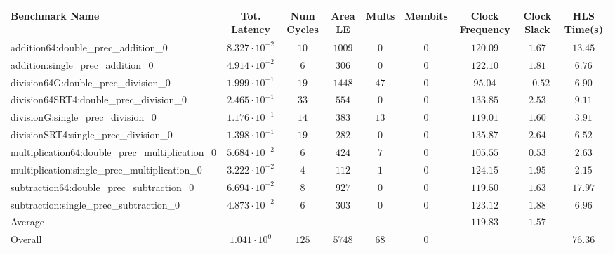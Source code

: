 \begin{tabular}{|l|c|c|c|c|c|c|c|c|}
\hline
Benchmark Name                                   & Tot. Latency            & Num Cycles & Area LE  & Mults  & Membits & Clock Frequency & Clock Slack & HLS Time(s) \\
\hline
addition64:double\_prec\_addition\_0             & $ 8.327 \cdot 10^{-2} $ & $ 10     $ & $ 1009 $ & $ 0  $ & $ 0   $ & $ 120.09      $ & $ 1.67    $ & $ 13.45   $ \\
addition:single\_prec\_addition\_0               & $ 4.914 \cdot 10^{-2} $ & $ 6      $ & $ 306  $ & $ 0  $ & $ 0   $ & $ 122.10      $ & $ 1.81    $ & $ 6.76    $ \\
division64G:double\_prec\_division\_0            & $ 1.999 \cdot 10^{-1} $ & $ 19     $ & $ 1448 $ & $ 47 $ & $ 0   $ & $ 95.04       $ & $ -0.52   $ & $ 6.90    $ \\
division64SRT4:double\_prec\_division\_0         & $ 2.465 \cdot 10^{-1} $ & $ 33     $ & $ 554  $ & $ 0  $ & $ 0   $ & $ 133.85      $ & $ 2.53    $ & $ 9.11    $ \\
divisionG:single\_prec\_division\_0              & $ 1.176 \cdot 10^{-1} $ & $ 14     $ & $ 383  $ & $ 13 $ & $ 0   $ & $ 119.01      $ & $ 1.60    $ & $ 3.91    $ \\
divisionSRT4:single\_prec\_division\_0           & $ 1.398 \cdot 10^{-1} $ & $ 19     $ & $ 282  $ & $ 0  $ & $ 0   $ & $ 135.87      $ & $ 2.64    $ & $ 6.52    $ \\
multiplication64:double\_prec\_multiplication\_0 & $ 5.684 \cdot 10^{-2} $ & $ 6      $ & $ 424  $ & $ 7  $ & $ 0   $ & $ 105.55      $ & $ 0.53    $ & $ 2.63    $ \\
multiplication:single\_prec\_multiplication\_0   & $ 3.222 \cdot 10^{-2} $ & $ 4      $ & $ 112  $ & $ 1  $ & $ 0   $ & $ 124.15      $ & $ 1.95    $ & $ 2.15    $ \\
subtraction64:double\_prec\_subtraction\_0       & $ 6.694 \cdot 10^{-2} $ & $ 8      $ & $ 927  $ & $ 0  $ & $ 0   $ & $ 119.50      $ & $ 1.63    $ & $ 17.97   $ \\
subtraction:single\_prec\_subtraction\_0         & $ 4.873 \cdot 10^{-2} $ & $ 6      $ & $ 303  $ & $ 0  $ & $ 0   $ & $ 123.12      $ & $ 1.88    $ & $ 6.96    $ \\
\hline
Average                                          & $                     $ & $        $ & $      $ & $    $ & $     $ & $ 119.83      $ & $ 1.57    $ & $         $ \\
\hline
Overall                                          & $ 1.041 \cdot 10^{0}  $ & $ 125    $ & $ 5748 $ & $ 68 $ & $ 0   $ & $             $ & $         $ & $ 76.36   $ \\
\hline
\end{tabular}
